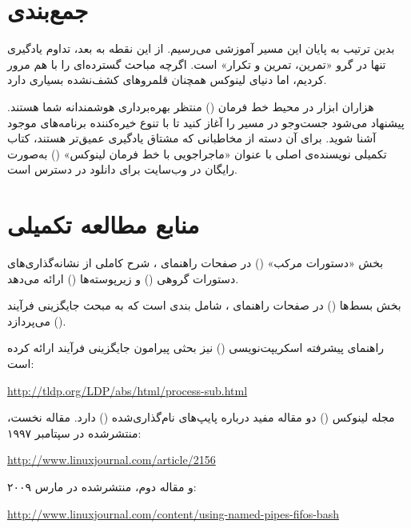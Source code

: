 \section{جمع‌بندی}

بدین ترتیب به پایان این مسیر آموزشی می‌رسیم. از این نقطه به بعد، تداوم یادگیری تنها در گرو «تمرین، تمرین و تکرار» است. اگرچه مباحث گسترده‌ای را با هم مرور کردیم، اما دنیای لینوکس همچنان قلمروهای کشف‌نشده بسیاری دارد.

هزاران ابزار در محیط خط فرمان () منتظر بهره‌برداری هوشمندانه شما هستند. پیشنهاد می‌شود جست‌وجو در مسیر  را آغاز کنید تا با تنوع خیره‌کننده برنامه‌های موجود آشنا شوید. برای آن دسته از مخاطبانی که مشتاق یادگیری عمیق‌تر هستند، کتاب تکمیلی نویسنده‌ی اصلی با عنوان «ماجراجویی با خط فرمان لینوکس» () به‌صورت رایگان در وب‌سایت  برای دانلود در دسترس است.

\section{منابع مطالعه تکمیلی}

بخش «دستورات مرکب» () در صفحات راهنمای ، شرح کاملی از نشانه‌گذاری‌های دستورات گروهی () و زیرپوسته‌ها () ارائه می‌دهد.

بخش بسط‌ها () در صفحات راهنمای ، شامل بندی است که به مبحث جایگزینی فرآیند () می‌پردازد.

راهنمای پیشرفته اسکریپت‌نویسی  () نیز بحثی پیرامون جایگزینی فرآیند ارائه کرده است:

\begin{latin}
\url{http://tldp.org/LDP/abs/html/process-sub.html}
\end{latin}

مجله لینوکس () دو مقاله مفید درباره پایپ‌های نام‌گذاری‌شده () دارد. مقاله نخست، منتشرشده در سپتامبر ۱۹۹۷:

\begin{latin}
\url{http://www.linuxjournal.com/article/2156}
\end{latin}

و مقاله دوم، منتشرشده در مارس ۲۰۰۹:

\begin{latin}
\url{http://www.linuxjournal.com/content/using-named-pipes-fifos-bash}
\end{latin}